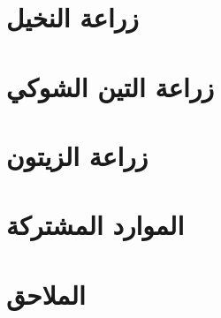 \documentclass[12pt,a4paper]{report}
\begin{document}
\chapter{زراعة النخيل}









\chapter{زراعة التين الشوكي}









\chapter{زراعة الزيتون}









\chapter{الموارد المشتركة}


%
%
%
%
%
%

\chapter{الملاحق}
%
%
%
\end{document}
